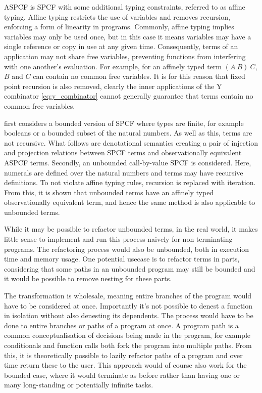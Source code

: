 \documentclass[12pt,a4paper]{report}
\theoremstyle{definition}
\theoremstyle{remark}
\begin{document}
ASPCF is SPCF with some additional typing constraints, referred to as affine typing. Affine typing restricts the use of variables and removes recursion, enforcing a form of linearity in programs. Commonly, affine typing implies variables may only be used once, but in this case it means variables may have a single reference or copy in use at any given time. Consequently, terms of an application may not share free variables, preventing functions from interfering with one another's evaluation. For example, for an affinely typed term $(A\ B)\ C$, $B$ and $C$ can contain no common free variables. It is for this reason that fixed point recursion is also removed, clearly the inner applications of the Y combinator \eqref{eq:y_combinator} cannot generally guarantee that terms contain no common free variables.

\cite{laird_2007} first considers a bounded version of SPCF where types are finite, for example booleans or a bounded subset of the natural numbers. As well as this, terms are not recursive. What follows are denotational semantics creating a pair of injection and projection relations between SPCF terms and observationally equivalent ASPCF terms. Secondly, an unbounded call-by-value SPCF is considered. Here, numerals are defined over the natural numbers and terms may have recursive definitions. To not violate affine typing rules, recursion is replaced with iteration. From this, it is shown that unbounded terms have an affinely typed observationally equivalent term, and hence the same method is also applicable to unbounded terms.

While it may be possible to refactor unbounded terms, in the real world, it makes little sense to implement and run this process naively for non terminating programs. The refactoring process would also be unbounded, both in execution time and memory usage. One potential usecase is to refactor terms in parts, considering that some paths in an unbounded program may still be bounded and it would be possible to remove nesting for these parts.

The transformation is wholesale, meaning entire branches of the program would have to be considered at once. Importantly it's not possible to denest a function in isolation without also denesting its dependents. The process would have to be done to entire branches or paths of a program at once. A program path is a common conceptualisation of decisions being made in the program, for example conditionals and function calls both fork the program into multiple paths. From this, it is theoretically possible to lazily refactor paths of a program and over time return these to the user. This approach would of course also work for the bounded case, where it would terminate as before rather than having one or many long-standing or potentially infinite tasks. 
\end{document}
